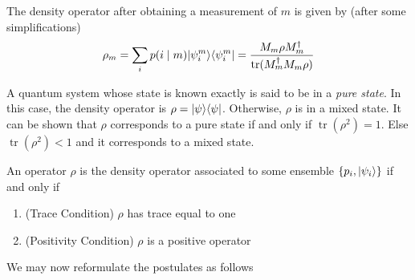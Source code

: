 The density operator after obtaining a measurement of $m$ is given by (after some simplifications)
\begin{equation*}
    \rho_m = \sum_i p(i\mid m)|\psi_i^m\rangle\langle\psi_i^m| = \frac{M_m\rho M_m^\dagger}{\operatorname{tr}(M_m^\dagger M_m\rho)}
\end{equation*}

A quantum system whose state is known exactly is said to be in a \textit{pure state}. In this case, the density operator is $\rho = |\psi\rangle\langle\psi|$. Otherwise, $\rho$ is in a mixed state. It can be shown that $\rho$ corresponds to a pure state if and only if $\operatorname{tr}(\rho^2) = 1$. Else $\operatorname{tr}(\rho^2) < 1$ and it corresponds to a mixed state.

\begin{theorem}
    An operator $\rho$ is the density operator associated to some ensemble $\{p_i,|\psi_i\rangle\}$ if and only if 
    \begin{enumerate}
        \item (Trace Condition) $\rho$ has trace equal to one 
        \item (Positivity Condition) $\rho$ is a positive operator
    \end{enumerate}
\end{theorem}

We may now reformulate the postulates as follows

